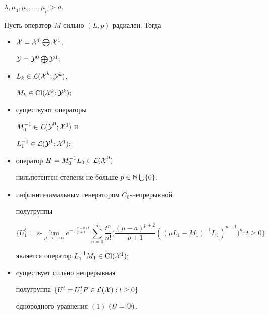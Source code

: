 $\lambda,\mu_0,\mu_1,\dotsc,\mu_p>a$.





\begin{thm}


Пусть оператор $M$ сильно $(L,p)$-радиален. Тогда


\begin{itemize}


\item[(i)] ${\cal X}={\cal X}^0 \bigoplus{\cal X}^1$,


${\cal Y}={\cal Y}^0\bigoplus{\cal Y}^1;$


\item[(ii)] $L_k\in{\cal L(\cal X}^k;{\cal Y}^k)$,


$M_k\in\operatorname{Cl} ({\cal X}^k;{\cal Y}^k);$


\item[(iii)] существуют операторы


$M^{-1}_0\in{\cal L(\cal Y}^0;{\cal X}^0)$ и


$L^{-1}_1\in{\cal L(\cal Y}^1;{\cal X}^1);$


\item[(iv)] оператор $H=M^{-1}_0L_0\in {\cal L(\cal X}^0)$


нильпотентен степени не больше $p\in {\Bbb N}\bigcup \{0\};$


\item[(v)] инфинитезимальным генератором $C_0$-непрерывной


полугруппы


$$\bigg\{U^t_1=s\text{-}\lim\limits_{\mu\to+\infty}e^{-\frac{


(\mu-a)t}{p+1}}\sum\limits_{n=0}^{\infty}\frac{t^n}{n!}\bigg(\frac


{(\mu-a)^{p+2}}{p+1}((\mu L_1-M_1)^{-1}L_1)^{p+1}\bigg)^n


:t\ge 0\bigg\}


$$


является оператор $L_1^{-1}M_1\in\operatorname{Cl} ({\cal X}^1);$


\item[(vi)] cуществует сильно непрерывная


полугруппа $\{U^t=U^t_1P\in{\cal L(\cal X)}:t\ge 0\}$


однородного уравнения $(1)$ $(B={\Bbb O})$.


\end{itemize}


\end{thm}





